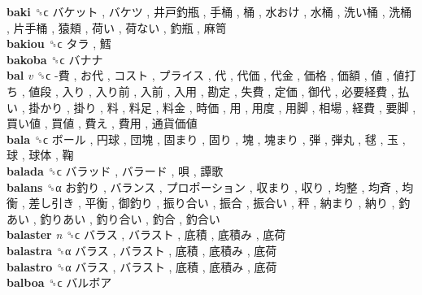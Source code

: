 \textbf{baki} ␝ϲ   バケット ,  バケツ ,  井戸釣瓶 ,  手桶 ,  桶 ,  水おけ ,  水桶 ,  洗い桶 ,  洗桶 ,  片手桶 ,  猿頬 ,  荷い ,  荷ない ,  釣瓶 ,  麻笥   \\
\textbf{bakiou} ␝ϲ   タラ ,  鱈   \\
\textbf{bakoba} ␝ϲ   バナナ   \\
\textbf{bal} \emph{v}  ␝ϲ   -費 ,  お代 ,  コスト ,  プライス ,  代 ,  代価 ,  代金 ,  価格 ,  価額 ,  値 ,  値打ち ,  値段 ,  入り ,  入り前 ,  入前 ,  入用 ,  勘定 ,  失費 ,  定価 ,  御代 ,  必要経費 ,  払い ,  掛かり ,  掛り ,  料 ,  料足 ,  料金 ,  時価 ,  用 ,  用度 ,  用脚 ,  相場 ,  経費 ,  要脚 ,  買い値 ,  買値 ,  費え ,  費用 ,  通貨価値   \\
\textbf{bala} ␝ϲ   ボール ,  円球 ,  団塊 ,  固まり ,  固り ,  塊 ,  塊まり ,  弾 ,  弾丸 ,  毬 ,  玉 ,  球 ,  球体 ,  鞠   \\
\textbf{balada} ␝ϲ   バラッド ,  バラード ,  唄 ,  譚歌   \\
\textbf{balans} ␝α   お釣り ,  バランス ,  プロポーション ,  収まり ,  収り ,  均整 ,  均斉 ,  均衡 ,  差し引き ,  平衡 ,  御釣り ,  振り合い ,  振合 ,  振合い ,  秤 ,  納まり ,  納り ,  釣あい ,  釣りあい ,  釣り合い ,  釣合 ,  釣合い   \\
\textbf{balaster} \emph{n}  ␝ϲ   バラス ,  バラスト ,  底積 ,  底積み ,  底荷   \\
\textbf{balastra} ␝α   バラス ,  バラスト ,  底積 ,  底積み ,  底荷   \\
\textbf{balastro} ␝α   バラス ,  バラスト ,  底積 ,  底積み ,  底荷   \\
\textbf{balboa} ␝ϲ   バルボア   \\
